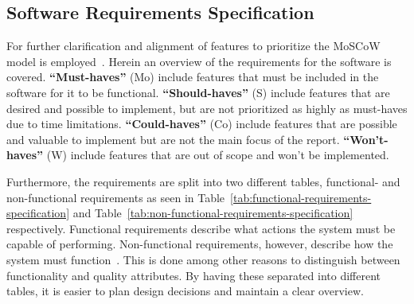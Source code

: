 \subsection{Software Requirements Specification}\label{subsec:software-requirements-specification}

For further clarification and alignment of features to prioritize the MoSCoW model is employed~\cite{hudaib2018}.
Herein an overview of the requirements for the software is covered.
\textbf{``Must-haves''} (Mo) include features that must be included in the software for it to be functional.
\textbf{``Should-haves''} (S) include features that are desired and possible to implement, but are not prioritized as
highly as must-haves due to time limitations.
\textbf{``Could-haves''} (Co) include features that are possible and valuable to implement but are not the main
focus of the report.
\textbf{``Won't-haves''} (W) include features that are out of scope and won't be implemented.

Furthermore, the requirements are split into two different tables, functional- and non-functional requirements as seen
in Table~\ref{tab:functional-requirements-specification} and Table~\ref{tab:non-functional-requirements-specification}
respectively.
Functional requirements describe what actions the system must be capable of performing.
Non-functional requirements, however, describe how the system must function~\cite{benyon2019}.
This is done among other reasons to distinguish between functionality and quality attributes.
By having these separated into different tables, it is easier to plan design decisions and maintain a clear overview.

